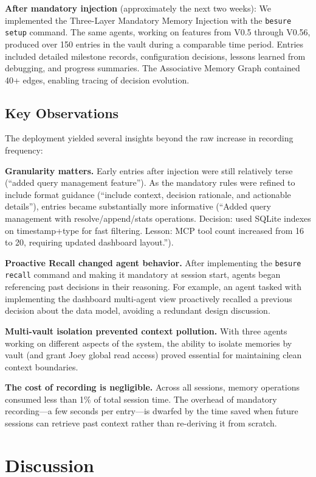 \documentclass[11pt]{article}
\begin{document}
\textbf{After mandatory injection} (approximately the next two weeks): We implemented the Three-Layer Mandatory Memory Injection with the \texttt{besure setup} command. The same agents, working on features from V0.5 through V0.56, produced over 150 entries in the vault during a comparable time period. Entries included detailed milestone records, configuration decisions, lessons learned from debugging, and progress summaries. The Associative Memory Graph contained 40+ edges, enabling tracing of decision evolution.

\subsection{Key Observations}

The deployment yielded several insights beyond the raw increase in recording frequency:

\textbf{Granularity matters.} Early entries after injection were still relatively terse (``added query management feature''). As the mandatory rules were refined to include format guidance (``include context, decision rationale, and actionable details''), entries became substantially more informative (``Added query management with resolve/append/stats operations. Decision: used SQLite indexes on timestamp+type for fast filtering. Lesson: MCP tool count increased from 16 to 20, requiring updated dashboard layout.'').

\textbf{Proactive Recall changed agent behavior.} After implementing the \texttt{besure recall} command and making it mandatory at session start, agents began referencing past decisions in their reasoning. For example, an agent tasked with implementing the dashboard multi-agent view proactively recalled a previous decision about the data model, avoiding a redundant design discussion.

\textbf{Multi-vault isolation prevented context pollution.} With three agents working on different aspects of the system, the ability to isolate memories by vault (and grant Joey global read access) proved essential for maintaining clean context boundaries.

\textbf{The cost of recording is negligible.} Across all sessions, memory operations consumed less than 1\% of total session time. The overhead of mandatory recording---a few seconds per entry---is dwarfed by the time saved when future sessions can retrieve past context rather than re-deriving it from scratch.


\section{Discussion}
\end{document}
